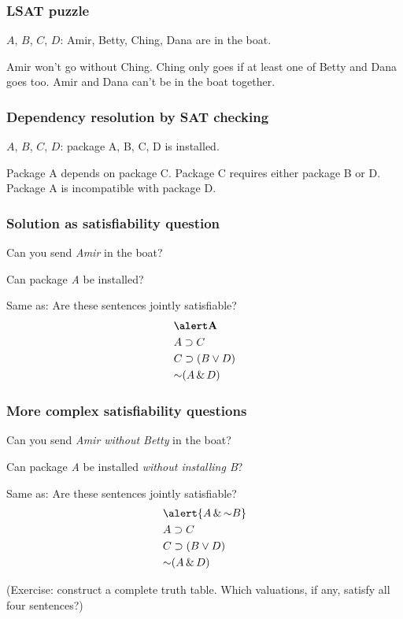 \begin{frame}
\frametitle{LSAT puzzle}

$A$, $B$, $C$, $D$: Amir, Betty, Ching, Dana are in the boat.

Amir won't go without Ching.
%
Ching only goes if at least one of Betty and Dana goes too.
%
Amir and Dana can't be in the boat together.
\end{frame}

\begin{frame}
\frametitle{Dependency resolution by SAT checking}

$A$, $B$, $C$, $D$: package A, B, C, D is installed.

Package A depends on package C.
%
Package C requires either package B or D.
%
Package A is incompatible with package D.
\end{frame}

\begin{frame}
\frametitle{Solution as satisfiability question}

Can you send \emph{Amir} in the boat?

Can package \emph{A} be installed?

Same as: Are these sentences jointly satisfiable?
\begin{align*}
& \emph{A}\\
& A \eif C\\
& C \eif (B \eor D) \\
& \enot (A \eand D)
\end{align*}
\end{frame}

\begin{frame}
  \frametitle{More complex satisfiability questions}
  
  Can you send \emph{Amir without Betty} in the boat?
  
  Can package \emph{A} be installed \emph{without installing B}?
  
  Same as: Are these sentences jointly satisfiable?
  \begin{align*}
  & \alert{A \eand \enot B}\\
  & A \eif C\\
  & C \eif (B \eor D) \\
  & \enot (A \eand D)
  \end{align*}
  
  (Exercise: construct a complete truth table. Which valuations, if any,
  satisfy all four sentences?)
  \end{frame}
  
